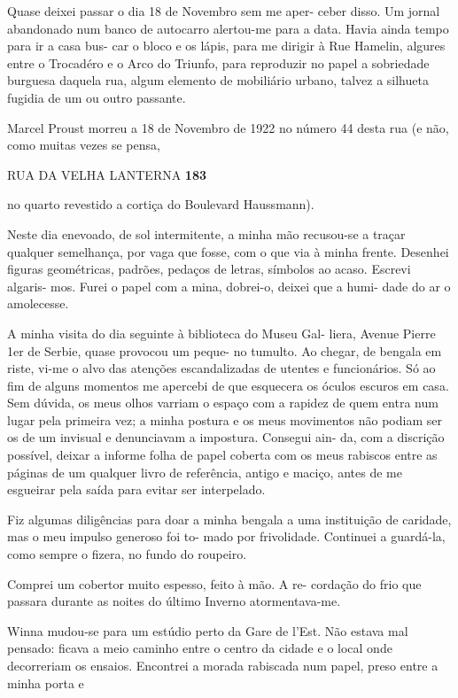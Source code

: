 Quase deixei passar o dia 18 de Novembro sem me aper- ceber disso. Um
jornal abandonado num banco de autocarro alertou-me para a data. Havia
ainda tempo para ir a casa bus- car o bloco e os lápis, para me dirigir
à Rue Hamelin, algures entre o Trocadéro e o Arco do Triunfo, para
reproduzir no papel a sobriedade burguesa daquela rua, algum elemento de
mobiliário urbano, talvez a silhueta fugidia de um ou outro passante.

Marcel Proust morreu a 18 de Novembro de 1922 no número 44 desta rua (e
não, como muitas vezes se pensa,

RUA DA VELHA LANTERNA \textbf{183}

no quarto revestido a cortiça do Boulevard Haussmann).

Neste dia enevoado, de sol intermitente, a minha mão recusou-se a traçar
qualquer semelhança, por vaga que fosse, com o que via à minha frente.
Desenhei figuras geométricas, padrões, pedaços de letras, símbolos ao
acaso. Escrevi algaris- mos. Furei o papel com a mina, dobrei-o, deixei
que a humi- dade do ar o amolecesse.

A minha visita do dia seguinte à biblioteca do Museu Gal- liera, Avenue
Pierre 1er de Serbie, quase provocou um peque- no tumulto. Ao chegar, de
bengala em riste, vi-me o alvo das atenções escandalizadas de utentes e
funcionários. Só ao fim de alguns momentos me apercebi de que esquecera
os óculos escuros em casa. Sem dúvida, os meus olhos varriam o espaço
com a rapidez de quem entra num lugar pela primeira vez; a minha postura
e os meus movimentos não podiam ser os de um invisual e denunciavam a
impostura. Consegui ain- da, com a discrição possível, deixar a informe
folha de papel coberta com os meus rabiscos entre as páginas de um
qualquer livro de referência, antigo e maciço, antes de me esgueirar
pela saída para evitar ser interpelado.

Fiz algumas diligências para doar a minha bengala a uma instituição de
caridade, mas o meu impulso generoso foi to- mado por frivolidade.
Continuei a guardá-la, como sempre o fizera, no fundo do roupeiro.

Comprei um cobertor muito espesso, feito à mão. A re- cordação do frio
que passara durante as noites do último Inverno atormentava-me.

Winna mudou-se para um estúdio perto da Gare de l'Est. Não estava mal
pensado: ficava a meio caminho entre o centro da cidade e o local onde
decorreriam os ensaios. Encontrei a morada rabiscada num papel, preso
entre a minha porta e

